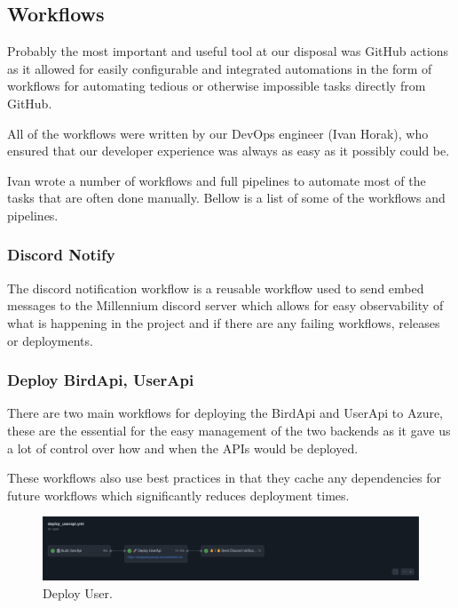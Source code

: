 \documentclass[a4paper]{article}
\begin{document}
\subsection{Workflows}

Probably the most important and useful tool at our disposal was GitHub actions as it allowed for 
easily configurable and integrated automations in the form of workflows for automating tedious or 
otherwise impossible tasks directly from GitHub.\newline

All of the workflows were written by our DevOps engineer (Ivan Horak), who ensured that our developer
experience was always as easy as it possibly could be. 
\newline 

Ivan wrote a number of workflows and full pipelines to automate most of the tasks that are often 
done manually. Bellow is a list of some of the workflows and pipelines. 

\subsubsection{Discord Notify}

The discord notification workflow is a reusable workflow used to send embed messages 
to the Millennium discord server which allows for easy observability of what is happening
in the project and if there are any failing workflows, releases or deployments.

\subsubsection{Deploy BirdApi, UserApi}

There are two main workflows for deploying the BirdApi and UserApi to Azure, these are the 
essential for the easy management of the two backends as it gave us a lot of control over 
how and when the APIs would be deployed.
\newline \newline

These workflows also use best practices in that they cache any dependencies for future workflows 
which significantly reduces deployment times.

\begin{figure}[h]
  \includegraphics[width=\linewidth]{../Assets/deploy_user.png}
  \caption{Deploy User.}
  \label{fig:load graphs}
\end{figure}
\end{document}
